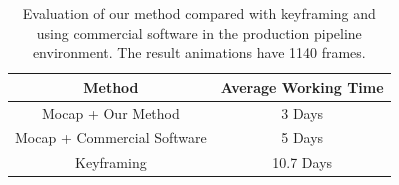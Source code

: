 %
\begin{table}[!ht]
\centering
\begin{tabular}{ | c | c | }
  \hline
  Method & Average Working Time \\ \hline
  Mocap + Our Method & 3 Days \\ 
  Mocap + Commercial Software & 5 Days \\
  Keyframing & 10.7 Days \\
  \hline
\end{tabular}
\caption{Evaluation of our method compared with keyframing and using commercial software in the production pipeline environment. The result animations have 1140 frames.}
\label{table:editing_evaluation}
\end{table}


